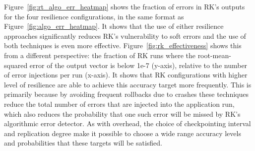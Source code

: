 \documentclass{sig-alternate}
\begin{document}
{Figure~\ref{fig:rt_algo_err_heatmap} shows the fraction of errors in RK's outputs for the four resilience configurations, in the same format as Figure~\ref{fig:algo_err_heatmap}.
It shows that the use of either resilience approaches significantly reduces RK's vulnerability to soft errors and the use of both techniques is even more effective.
Figure~\ref{fig:rk_effectiveness} shows this from a different perspective: the fraction of RK runs where the root-mean-squared error of the output vector is below 1e-7 (y-axis), relative to the number of error injections per run (x-axis).
It shows that RK configurations with higher level of resilience are able to achieve this accuracy target more frequently.
This is primarily because by avoiding frequent rollbacks due to crashes these techniques reduce the total number of errors that are injected into the application run, which also reduces the probability that one such error will be missed by RK's algorithmic error detector.
As with overhead, the choice of checkpointing interval and replication degree make it possible to choose a wide range accuracy levels and probabilities that these targets will be satisfied.

}
\end{document}
